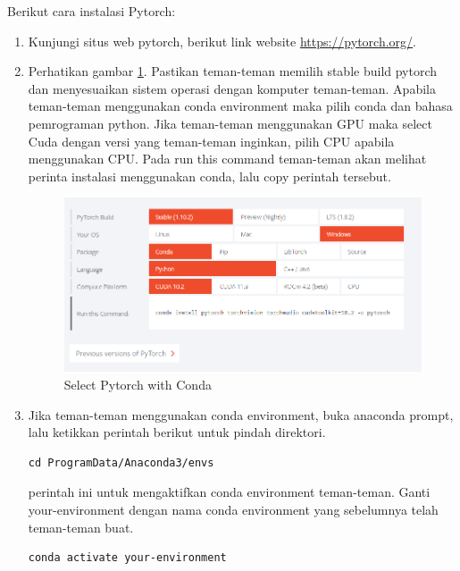 Berikut cara instalasi Pytorch:
\begin{enumerate}
\item Kunjungi situs web pytorch, berikut link website \small \url{https://pytorch.org/}.
\item Perhatikan gambar \ref{pytorch1}. Pastikan teman-teman memilih stable build pytorch dan menyesuaikan sistem operasi dengan komputer teman-teman. Apabila teman-teman menggunakan conda environment maka pilih conda dan bahasa pemrograman python. Jika teman-teman menggunakan GPU maka select Cuda dengan versi yang teman-teman inginkan, pilih CPU apabila menggunakan CPU. Pada run this command teman-teman akan melihat perinta instalasi menggunakan conda, lalu copy perintah tersebut.
\begin{figure}[H]
\centering
\includegraphics[scale=.35]{figures/pytorch1}
\caption{Select Pytorch with Conda}
\label{pytorch1}
\end{figure}

\item Jika teman-teman menggunakan conda environment, buka anaconda prompt, lalu ketikkan perintah berikut untuk pindah direktori.
\begin{verbatim}
cd ProgramData/Anaconda3/envs
\end{verbatim}
perintah ini untuk mengaktifkan conda environment teman-teman. Ganti your-environment dengan nama conda environment yang sebelumnya telah teman-teman buat.
\begin{verbatim}
conda activate your-environment
\end{verbatim}


\end{enumerate}
